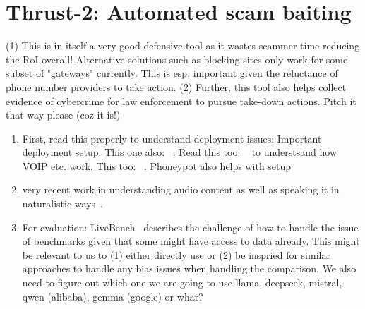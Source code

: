 
\section{Thrust-2: Automated scam baiting}
\label{sec:thrust_two}




(1) This is in itself a very good defensive tool as it wastes scammer time reducing the RoI overall! Alternative solutions such as blocking sites only work for some subset of "gateways" currently. This is esp. important given the reluctance of phone number providers to take action.  (2) Further, this tool also helps collect evidence of cybercrime for law enforcement to pursue take-down actions.  Pitch it that way please (coz it is!)

\begin{enumerate}
    \item First, read this properly to understand deployment issues: \cite{SahinRF17} Important deployment setup. This one also: ~\cite{SahinFGA17}. Read this too: ~\cite{ReavesBT16} to understsand how VOIP etc. work. This too: ~\cite{TuDZA16}. Phoneypot also helps with setup~\cite{GuptaSBA15}
    \item very recent work in understanding audio content as well as speaking it in naturalistic ways~\cite{abs-2412-02612,abs-2407-10759}. 
    \item For evaluation: LiveBench~\cite{WhiteDRPF0SJSDS25} describes the challenge of how to handle the issue of benchmarks given that some might have access to data already. This might be relevant to us to (1) either directly use or (2) be inspried for similar approaches to handle any bias issues when handling the comparison. We also need to figure out which one we are going to use llama, deepseek, mistral, qwen (alibaba), gemma (google) or what? 
\end{enumerate}


